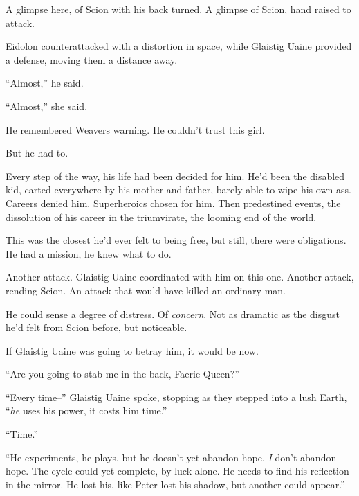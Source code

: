 A glimpse here, of Scion with his back turned.  A glimpse of Scion, hand raised to attack.



Eidolon counterattacked with a distortion in space, while Glaistig Uaine provided a defense, moving them a distance away.



``Almost,'' he said.



``Almost,'' she said.



He remembered Weavers warning.  He couldn't trust this girl.



But he had to.



Every step of the way, his life had been decided for him.  He'd been the disabled kid, carted everywhere by his mother and father, barely able to wipe his own ass.  Careers denied him.  Superheroics chosen for him.  Then predestined events, the dissolution of his career in the triumvirate, the looming end of the world.



This was the closest he'd ever felt to being free, but still, there were obligations.  He had a mission, he knew what to do.



Another attack.  Glaistig Uaine coordinated with him on this one.  Another attack, rending Scion.  An attack that would have killed an ordinary man.



He could sense a degree of distress.  Of \emph{concern}.  Not as dramatic as the disgust he'd felt from Scion before, but noticeable.



If Glaistig Uaine was going to betray him, it would be now.



``Are you going to stab me in the back, Faerie Queen?''



``Every time--'' Glaistig Uaine spoke, stopping as they stepped into a lush Earth, ``\emph{he} uses his power, it costs him time.''



``Time.''



``He experiments, he plays, but he doesn't yet abandon hope.  \emph{I} don't abandon hope.  The cycle could yet complete, by luck alone.  He needs to find his reflection in the mirror.  He lost his, like Peter lost his shadow, but another could appear.''




